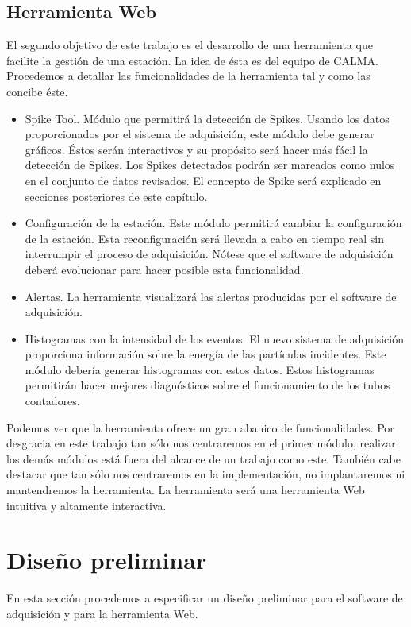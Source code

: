 	\subsection{Herramienta Web}
		El segundo objetivo de este trabajo es el desarrollo de una herramienta que facilite la gestión de una estación. La idea de ésta
		es del equipo de CALMA. Procedemos a detallar las funcionalidades de la herramienta tal y como las concibe éste.
		\begin{itemize}
			\item	Spike Tool. Módulo que permitirá la detección de Spikes. Usando los datos proporcionados por el sistema de
				adquisición, este módulo debe generar gráficos. Éstos serán interactivos y su propósito será hacer más fácil la
				detección de Spikes. Los Spikes detectados podrán ser marcados como nulos en el conjunto de datos revisados. El
				concepto de Spike será explicado en secciones posteriores de este capítulo.
			\item 	Configuración de la estación. Este módulo permitirá cambiar la configuración de la estación. Esta reconfiguración será
				llevada a cabo en tiempo real sin interrumpir el proceso de adquisición. Nótese que el software de adquisición deberá
				evolucionar para hacer posible esta funcionalidad.
			\item	Alertas. La herramienta visualizará las alertas producidas por el software de adquisición.
			\item 	Histogramas con la intensidad de los eventos. El nuevo sistema de adquisición proporciona información sobre la energía
				de las partículas incidentes. Este módulo debería generar histogramas con estos datos. Estos histogramas permitirán
				hacer mejores diagnósticos sobre el funcionamiento de los tubos contadores. 
		\end{itemize}
		Podemos ver que la herramienta ofrece un gran abanico de funcionalidades. Por desgracia en este trabajo tan sólo nos centraremos en el
		primer módulo, realizar los demás módulos está fuera del alcance de un trabajo como este. También cabe destacar que tan sólo nos
		centraremos en la implementación, no implantaremos ni mantendremos la herramienta. La herramienta será una herramienta Web intuitiva y
		altamente interactiva.

\section{Diseño preliminar}
	En esta sección procedemos a especificar un diseño preliminar para el software de adquisición y para la herramienta Web.
